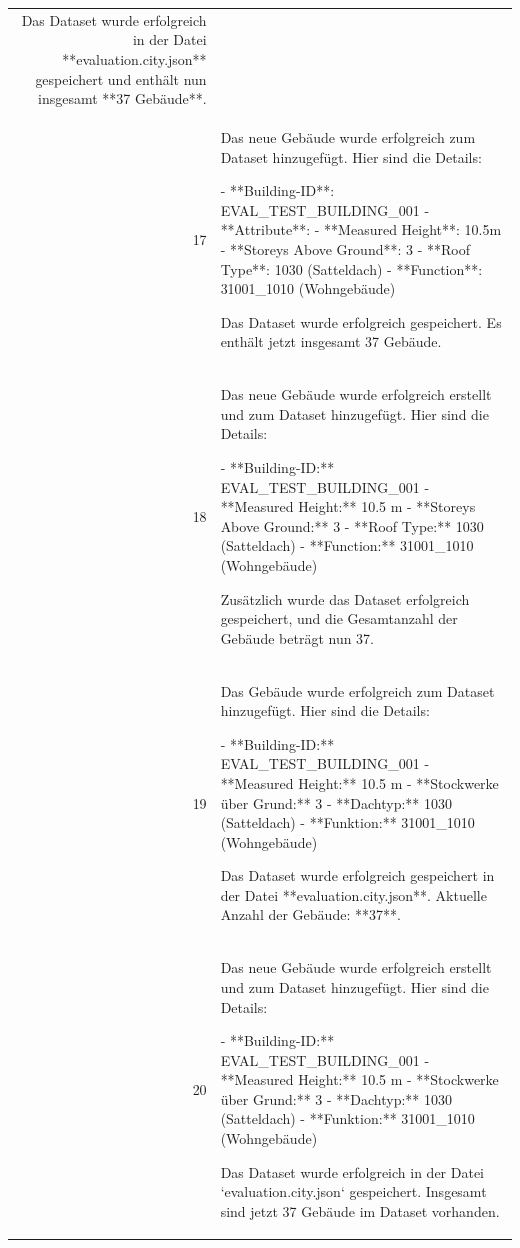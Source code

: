 \documentclass[a4paper,11pt]{article}
\begin{document}
\begin{table}[ht]
\begin{tabular}{r p{12cm}}
Das Dataset wurde erfolgreich in der Datei **evaluation.city.json** gespeichert und enthält nun insgesamt **37 Gebäude**. \\
17 & Das neue Gebäude wurde erfolgreich zum Dataset hinzugefügt. Hier sind die Details:

- **Building-ID**: EVAL\_TEST\_BUILDING\_001
- **Attribute**:
  - **Measured Height**: 10.5m
  - **Storeys Above Ground**: 3
  - **Roof Type**: 1030 (Satteldach)
  - **Function**: 31001\_1010 (Wohngebäude)

Das Dataset wurde erfolgreich gespeichert. Es enthält jetzt insgesamt 37 Gebäude. \\
18 & Das neue Gebäude wurde erfolgreich erstellt und zum Dataset hinzugefügt. Hier sind die Details:

- **Building-ID:** EVAL\_TEST\_BUILDING\_001
- **Measured Height:** 10.5 m
- **Storeys Above Ground:** 3
- **Roof Type:** 1030 (Satteldach)
- **Function:** 31001\_1010 (Wohngebäude)

Zusätzlich wurde das Dataset erfolgreich gespeichert, und die Gesamtanzahl der Gebäude beträgt nun 37. \\
19 & Das Gebäude wurde erfolgreich zum Dataset hinzugefügt. Hier sind die Details:

- **Building-ID:** EVAL\_TEST\_BUILDING\_001
- **Measured Height:** 10.5 m
- **Stockwerke über Grund:** 3
- **Dachtyp:** 1030 (Satteldach)
- **Funktion:** 31001\_1010 (Wohngebäude)

Das Dataset wurde erfolgreich gespeichert in der Datei **evaluation.city.json**. Aktuelle Anzahl der Gebäude: **37**. \\
20 & Das neue Gebäude wurde erfolgreich erstellt und zum Dataset hinzugefügt. Hier sind die Details:

- **Building-ID:** EVAL\_TEST\_BUILDING\_001
- **Measured Height:** 10.5 m
- **Stockwerke über Grund:** 3
- **Dachtyp:** 1030 (Satteldach)
- **Funktion:** 31001\_1010 (Wohngebäude)

Das Dataset wurde erfolgreich in der Datei `evaluation.city.json` gespeichert. Insgesamt sind jetzt 37 Gebäude im Dataset vorhanden. \\
\hline
\end{tabular}
\end{table}

\clearpage
\end{document}
